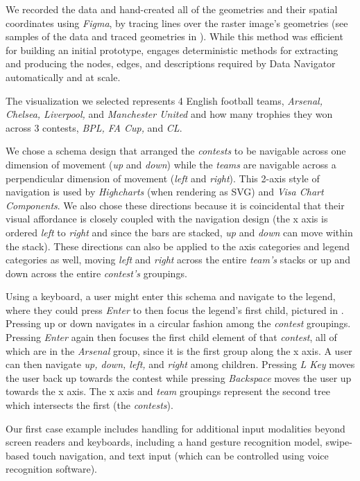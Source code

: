 \documentclass[12pt]{cmuthesis}
\begin{document}
We recorded the data and hand-created all of the geometries and their spatial coordinates using \textit{Figma}, by tracing lines over the raster image's geometries (see samples of the data and traced geometries in ). While this method was efficient for building an initial prototype,  engages deterministic methods for extracting and producing the nodes, edges, and descriptions required by Data Navigator automatically and at scale.

The visualization we selected represents 4 English football teams, \textit{Arsenal, Chelsea, Liverpool,} and \textit{Manchester United} and how many trophies they won across 3 contests, \textit{BPL, FA Cup,} and \textit{CL}.

We chose a schema design that arranged the \textit{contests} to be navigable across one dimension of movement (\textit{up} and \textit{down}) while the \textit{teams} are navigable across a perpendicular dimension of movement (\textit{left} and \textit{right}). This 2-axis style of navigation is used by \textit{Highcharts} (when rendering as SVG) and \textit{Visa Chart Components}. We also chose these directions because it is coincidental that their visual affordance is closely coupled with the navigation design (the x axis is ordered \textit{left} to \textit{right} and since the bars are stacked, \textit{up} and \textit{down} can move within the stack). These directions can also be applied to the axis categories and legend categories as well, moving \textit{left} and \textit{right} across the entire \textit{team's} stacks or up and down across the entire \textit{contest's} groupings.

Using a keyboard, a user might enter this schema and navigate to the legend, where they could press \textit{Enter} to then focus the legend's first child, pictured in . Pressing up or down navigates in a circular fashion among the \textit{contest} groupings. Pressing \textit{Enter} again then focuses the first child element of that \textit{contest}, all of which are in the \textit{Arsenal} group, since it is the first group along the x axis. A user can then navigate \textit{up, down, left,} and \textit{right} among children. Pressing \textit{L Key} moves the user back up towards the contest while pressing \textit{Backspace} moves the user up towards the x axis. The x axis and \textit{team} groupings represent the second tree which intersects the first (the \textit{contests}).

Our first case example includes handling for additional input modalities beyond screen readers and keyboards, including a hand gesture recognition model, swipe-based touch navigation, and text input (which can be controlled using voice recognition software).
\end{document}
